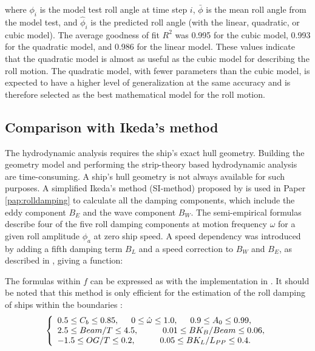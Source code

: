 where $\phi_i$ is the model test roll angle at time step $i$, $\bar \phi$ is the mean roll angle from the model test, and $\hat{\phi}_i$ is the predicted roll angle (with the linear, quadratic, or cubic model). The average goodness of fit $R^2$ was 0.995 for the cubic model, 0.993 for the quadratic model, and 0.986 for the linear model. These values indicate that the quadratic model is almost as useful as the cubic model for describing the roll motion. The quadratic model, with fewer parameters than the cubic model, is expected to have a higher level of generalization at the same accuracy and is therefore selected as the best mathematical model for the roll motion. 

\subsection{Comparison with Ikeda's method}
The hydrodynamic analysis requires the ship's exact hull geometry. Building the geometry model and performing the strip-theory based hydrodynamic analysis are time-consuming. A ship's hull geometry is not always available for such purposes. A simplified Ikeda's method (SI-method) proposed by \textcite{kawahara_simple_2011} is used in Paper \ref{pap:rolldamping} to calculate all the damping components, which include the eddy component $B_E$ and the wave component $B_W$. The semi-empirical formulas describe four of the five roll damping components at motion frequency $\omega$ for a given roll amplitude $\phi_a$ at zero ship speed. A speed dependency was introduced by adding a fifth damping term $B_L$ and a speed correction to $B_W$ and $B_E$, as described in \textcite{ikeda_velocity_1979}, giving a function: 


\noindent The formulas within $f$ can be expressed as \textcite{ikeda_velocity_1979, kawahara_simple_2011} with the implementation in \textcite{alexandersson_rolldecay-estimators_2022}.
It should be noted that this method is only efficient for the estimation of the roll damping of ships within the boundaries \parencite{kawahara_simple_2011}:
\begin{equation}
    \label{eq:SI_limits}
     \left\{
     \begin{array}{ll}
    0.5 \leq C_b \leq 0.85,\hspace{0.5cm} 
    0 \leq \hat{\omega} \leq 1.0,
    \hspace{0.5cm}
    0.9 \leq A_0 \leq 0.99,\\
    2.5\leq Beam/T \leq 4.5, \hspace{1cm}
    0.01 \leq BK_B/Beam \leq 0.06, \\
        -1.5 \leq OG/T \leq 0.2,
     \hspace{1cm}
    0.05 \leq BK_L/L_{PP} \leq 0.4.
    \end{array}
    \right.
\end{equation}

